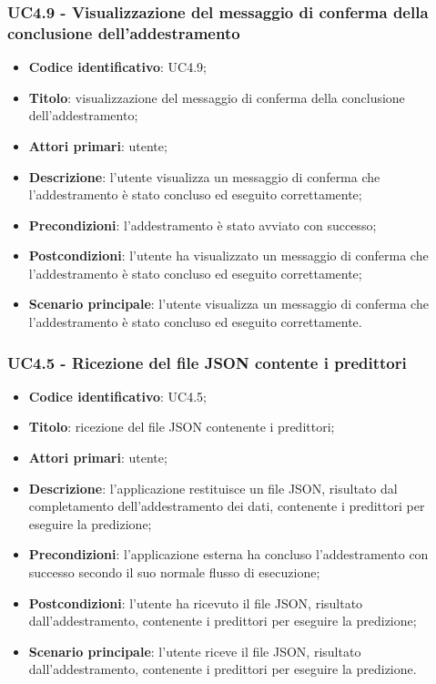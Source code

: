 \subsubsection{UC4.9 - Visualizzazione del messaggio di conferma della conclusione dell'addestramento}
\begin{itemize}
	\item \textbf{Codice identificativo}: UC4.9;
	\item \textbf{Titolo}: visualizzazione del messaggio di conferma della conclusione dell'addestramento;
	\item \textbf{Attori primari}: utente;
	\item \textbf{Descrizione}: l'utente visualizza un messaggio di conferma che l'addestramento è stato concluso ed eseguito correttamente;
	\item \textbf{Precondizioni}: l'addestramento è stato avviato con successo;
	\item \textbf{Postcondizioni}: l'utente ha visualizzato un messaggio di conferma che l'addestramento è stato concluso ed eseguito correttamente;
	\item \textbf{Scenario principale}: l'utente visualizza un messaggio di conferma che l'addestramento è stato concluso ed eseguito correttamente.
\end{itemize}

\subsubsection{UC4.5 - Ricezione del file JSON contente i predittori}
\begin{itemize}
    \item \textbf{Codice identificativo}: UC4.5;
    \item \textbf{Titolo}: ricezione del file JSON contenente i predittori;
    \item \textbf{Attori primari}: utente;
    \item \textbf{Descrizione}: l'applicazione restituisce un file JSON, risultato dal completamento dell'addestramento dei dati, contenente i predittori per eseguire la predizione;
    \item \textbf{Precondizioni}: l'applicazione esterna ha concluso l'addestramento con successo secondo il suo normale flusso di esecuzione;
    \item \textbf{Postcondizioni}: l'utente ha ricevuto il file JSON, risultato dall'addestramento, contenente i predittori per eseguire la predizione;
    \item \textbf{Scenario principale}: l'utente riceve il file JSON, risultato dall'addestramento, contenente i predittori per eseguire la predizione.
\end{itemize}